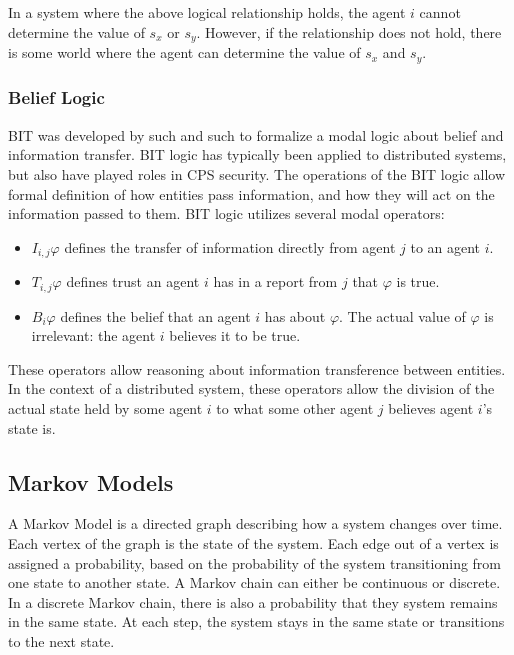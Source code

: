 In a system where the above logical relationship holds, the agent $i$ cannot determine the value of $s_x$ or $s_y$. However, if the relationship does not hold, there is some world where the agent can determine the value of $s_x$ and $s_y$.

\subsubsection{Belief Logic}

BIT was developed by such and such to formalize a modal logic about belief and information transfer. BIT logic has typically been applied to distributed systems, but also have played roles in CPS security. The operations of the BIT logic allow formal definition of how entities pass information, and how they will act on the information passed to them. BIT logic utilizes several modal operators:

\begin{itemize}
\item $I_{i,j} \varphi$ defines the transfer of information directly from agent $j$ to an agent $i$. 
\item $T_{i,j} \varphi$ defines trust an agent $i$ has in a report from $j$ that $\varphi$ is true.
\item $B_i \varphi$ defines the belief that an agent $i$ has about $\varphi$. The actual value of $\varphi$ is irrelevant: the agent $i$ believes it to be true.
\end{itemize}

These operators allow reasoning about information transference between entities. In the context of a distributed system, these operators allow the division of the actual state held by some agent $i$ to what some other agent $j$ believes agent $i$'s state is.

\subsection{Markov Models}

A Markov Model is a directed graph describing how a system changes over time. Each vertex of the graph is the state of the system. Each edge out of a vertex is assigned a probability, based on the probability of the system transitioning from one state to another state. A Markov chain can either be continuous or discrete. In a discrete Markov chain, there is also a probability that they system remains in the same state. At each step, the system stays in the same state or transitions to the next state.

